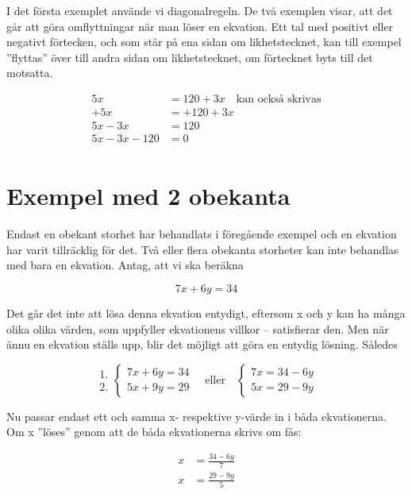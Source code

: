 I det första exemplet använde vi diagonalregeln.
De två exemplen visar, att det går att göra omflyttningar när man löser en
ekvation.
Ett tal med positivt eller negativt förtecken, och som står på ena sidan om
likhetstecknet, kan till exempel ''flyttas'' över till andra sidan om likhetstecknet,
om förtecknet byts till det motsatta.

\begin{align*}
  5x &= 120 + 3x \quad \text{kan också skrivas} \\
  +5x &= +120+ 3x \\
  5x-3x &= 120 \\
  5x- 3x-120 &= 0 \\
\end{align*}

\section{Exempel med 2 obekanta}

Endast en obekant storhet har behandlats i föregående exempel och en ekvation
har varit tillräcklig för det.
Två eller flera obekanta storheter kan inte behandlas med bara en ekvation.
Antag, att vi ska beräkna

\[7x+6y=34\]

Det går det inte att lösa denna ekvation entydigt, eftersom x och y kan ha många
olika olika värden, som uppfyller ekvationens villkor -- satisfierar den.
Men när ännu en ekvation ställs upp, blir det möjligt att göra en entydig
lösning.
Således

\[
\begin{array}{c}
1.\\2.
\end{array}
\left\{
\begin{array}{l}
7x + 6y = 34\\
5x + 9y = 29
\end{array}
\right.
\quad \text{eller} \quad
\left\{
\begin{array}{l}
7x = 34 - 6y\\
5x = 29 - 9y 
\end{array}
\right. 
\]

Nu passar endast ett och samma x- respektive y-värde in i båda ekvationerna.
Om x ''löses'' genom att de båda ekvationerna skrivs om fås:

\begin{align}
  \label{eq:1}
  x &= \frac{34-6y}{7}\\
  \label{eq:2}
  x &= \frac{29-9y}{5}
\end{align}

